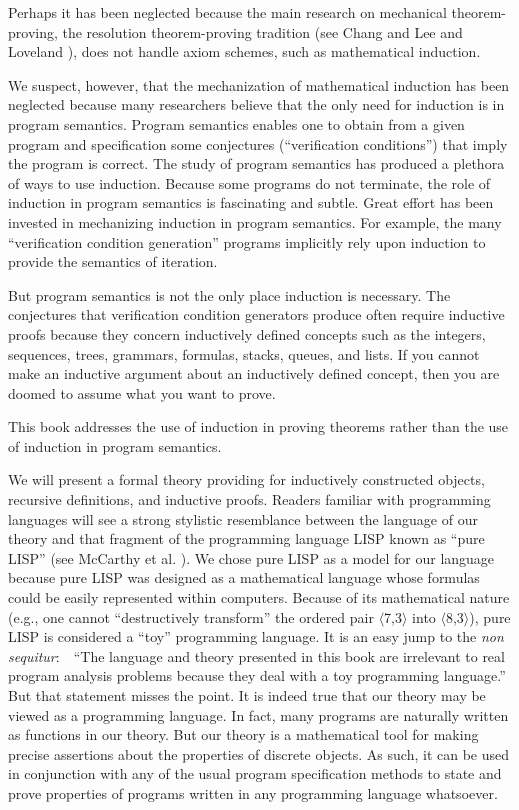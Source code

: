 \documentclass[10pt]{book}
\begin{document}
Perhaps it has been neglected because the main research
on mechanical theorem-proving, the resolution theorem-proving
tradition (see Chang and Lee \cite{CHANG} and Loveland \cite{LOVELAND}),
does not handle axiom schemes, such
as mathematical induction.

We suspect, however, that the mechanization of mathematical induction has
been neglected because many researchers believe that the only need for
induction is in program semantics.  Program
semantics enables one to obtain from a
given program and  specification some
conjectures (``verification conditions'') that imply the program is correct.
The study of program
semantics has produced a plethora of ways to use
induction.  Because some programs do not terminate,
the role of induction in program semantics is fascinating
and subtle.  Great effort has been invested in
mechanizing induction in program semantics.  For example, the 
many ``verification condition generation'' programs implicitly
rely upon induction to provide the semantics of iteration.

But program semantics is not the only place induction is necessary.
The conjectures that verification  condition generators produce  often
require inductive proofs because they concern inductively
defined concepts such as the integers, sequences, trees,
grammars, formulas, stacks, queues, and lists.
If you cannot make an
inductive argument about an inductively defined concept,
then you are doomed to assume
what you want to  prove.

This book addresses the use of induction in proving theorems
rather than the use of induction in program semantics.

We will present a formal theory providing for inductively
constructed objects, recursive definitions, and inductive proofs.
Readers familiar with programming languages will see a strong stylistic
resemblance between the language of our theory and that fragment of
the programming language LISP known as ``pure LISP'' (see McCarthy et al. \cite{LISPMANUAL}).
We chose pure LISP as a model for our language because
pure LISP was designed as a mathematical language 
whose formulas could be easily represented within
computers.  Because of its mathematical nature (e.g., one cannot
``destructively transform'' the ordered pair $\langle$7,3$\rangle$ into
$\langle$8,3$\rangle$),
pure LISP is considered a ``toy'' programming language.
It is an easy jump to the \emph{non sequitur}:~~``The language
and theory presented in this book are
irrelevant to real program analysis
problems because they deal with a toy programming language.''
But that statement misses the point.  It is indeed true that our theory may be viewed
as a programming language.  In fact, many programs are naturally written as functions
in our theory.
  But our theory is a mathematical tool for making precise assertions
about the properties of discrete objects.  As such, it can be used in
conjunction with any of the usual program specification methods to state and  prove
properties of programs written in any programming language
whatsoever.
\end{document}
